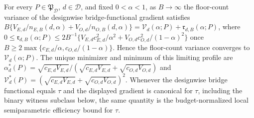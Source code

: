 For every \(P\in\mathfrak P_{\mathcal D}\), \(d\in\mathcal D\), and fixed \(0<\alpha<1\), as \(B\to\infty\) the floor-count variance of the designwise bridge-functional gradient satisfies \(B\{V_{E,d}/n_{E,B}(d,\alpha)+V_{O,d}/n_{O,B}(d,\alpha)\}=\mathcal V_d(\alpha;P)+\mathfrak r_{d,B}(\alpha;P)\), where \(0\le\mathfrak r_{d,B}(\alpha;P)\le 2B^{-1}\{V_{E,d}c_{E,d}^2/\alpha^2+V_{O,d}c_{O,d}^2/(1-\alpha)^2\}\) once \(B\ge2\max\{c_{E,d}/\alpha,c_{O,d}/(1-\alpha)\}\). Hence the floor-count variance converges to \(\mathcal V_d(\alpha;P)\). The unique minimizer and minimum of this limiting profile are \(\alpha_d^*(P)=\sqrt{c_{E,d}V_{E,d}}/(\sqrt{c_{E,d}V_{E,d}}+\sqrt{c_{O,d}V_{O,d}})\) and \(\mathcal V_d^*(P)=(\sqrt{c_{E,d}V_{E,d}}+\sqrt{c_{O,d}V_{O,d}})^2\).  Whenever the designwise bridge functional equals \(\tau\) and the displayed gradient is canonical for \(\tau\), including the binary witness subclass below, the same quantity is the budget-normalized local semiparametric efficiency bound for \(\tau\).